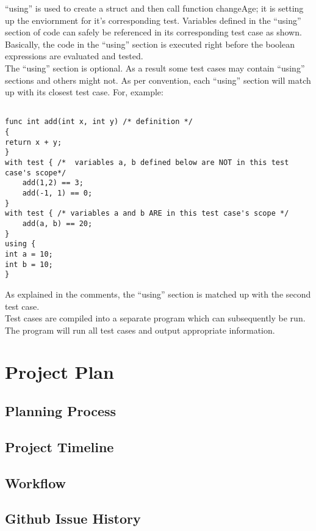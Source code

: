 \documentclass{article}
\begin{document}
``using'' is used to create a struct and then call function changeAge; it is setting up the enviornment for it's corresponding test. Variables defined in the ``using'' section of code can safely be referenced in its corresponding test case as shown. Basically, the code in the ``using'' section is executed right before the boolean expressions are evaluated and tested. \\
The ``using'' section is optional. As a result some test cases may contain ``using'' sections and others might not. As per convention, each ``using'' section will match up with its closest test case. For, example:

\begin{lstlisting}

func int add(int x, int y) /* definition */
{
return x + y;
}
with test { /*  variables a, b defined below are NOT in this test case's scope*/
	add(1,2) == 3;
	add(-1, 1) == 0;
}
with test { /* variables a and b ARE in this test case's scope */
	add(a, b) == 20;
}
using {
int a = 10;
int b = 10;
}

\end{lstlisting}

As explained in the comments, the ``using'' section is matched up with the second test case.
\\
Test cases are compiled into a separate program which can subsequently be run. The program will run all test cases and output appropriate information.
	
\section{Project Plan}

\subsection{Planning Process}

\subsection{Project Timeline}

\subsection{Workflow}

\subsection{Github Issue History} 
\end{document}
